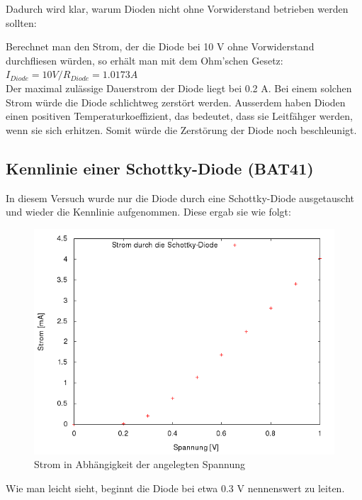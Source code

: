 Dadurch wird klar, warum Dioden nicht ohne Vorwiderstand betrieben werden sollten:

Berechnet man den Strom, der die Diode bei 10 V ohne Vorwiderstand durchfliesen würden, so erhält man mit dem Ohm'schen Gesetz:\\
$ I_{Diode} = 10V/R_{Diode} = 1.0173 A $\\
Der maximal zulässige Dauerstrom der Diode liegt bei 0.2 A. Bei einem solchen Strom würde die Diode schlichtweg zerstört werden. Ausserdem haben Dioden einen positiven Temperaturkoeffizient, das bedeutet, dass sie Leitfähger werden, wenn sie sich erhitzen. Somit würde die Zerstörung der Diode noch beschleunigt.

\subsection{Kennlinie einer Schottky-Diode (BAT41)}
In diesem Versuch wurde nur die Diode durch eine Schottky-Diode ausgetauscht und wieder die Kennlinie aufgenommen. Diese ergab sie wie folgt:
\begin{figure}[H]
	\centering
	\includegraphics[width=\linewidth]{versuch2/versuch_2_2.png}
	\caption{Strom in Abhängigkeit der angelegten Spannung}
\end{figure}
Wie man leicht sieht, beginnt die Diode bei etwa 0.3 V nennenswert zu leiten.

